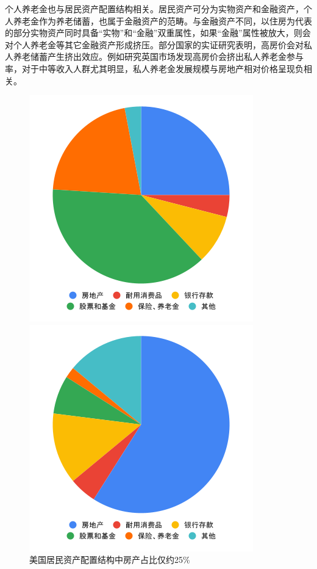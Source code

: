 \documentclass[a4paper,10.5pt]{ctexart}
\begin{document}
个人养老金也与居民资产配置结构相关。居民资产可分为实物资产和金融资产，个人养老金作为养老储蓄，也属于金融资产的范畴。与金融资产不同，以住房为代表的部分实物资产同时具备“实物”和“金融”双重属性，如果“金融”属性被放大，则会对个人养老金等其它金融资产形成挤压。部分国家的实证研究表明，高房价会对私人养老储蓄产生挤出效应。例如\citet{crawford2020impact}研究英国市场发现高房价会挤出私人养老金参与率，对于中等收入人群尤其明显，私人养老金发展规模与房地产相对价格呈现负相关。
\begin{figure}[H]
    \begin{minipage}{0.48\linewidth}
        \includegraphics[width=\linewidth]{img/us.png}
        \caption{美国居民资产配置结构中房产占比仅约25\%}
    \end{minipage}
    \begin{minipage}{0.48\linewidth}
        \includegraphics[width=\linewidth]{img/cn.png}

\end{minipage}
\end{figure}
\end{document}
